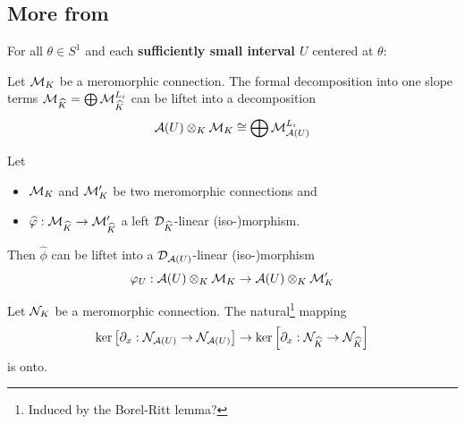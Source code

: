 \subsection{More from \cite{sabbah_cimpa90}}
For all $\theta\in S^1$ and each \textbf{sufficiently small interval $U$}
centered
at $\theta$:
\begin{cor}[2.3.2]
  Let $\mathcal{M}_K$ be a meromorphic connection.
  The formal decomposition into one slope terms
  $\mathcal{M}_{\widehat K}=\bigoplus \mathcal{M}_{\widehat K}^{L_i}$ can be liftet into a
  decomposition
  \[
    \mathcal{A}(U)\otimes_K\mathcal{M}_K \cong \bigoplus\mathcal{M}_{\mathcal{A}(U)}^{L_i}
  \]
\end{cor}
\begin{cor}[2.3.3]
  Let
  \begin{itemize}
    \item $\mathcal{M}_K$ and $\mathcal{M}_K'$ be two meromorphic connections and
    \item $\widehat{\varphi}:\mathcal{M}_{\widehat{K}}\to\mathcal{M}_{\widehat{K}}'$ a left
      $\mathcal{D}_{\widehat K}$-linear \textcolor{green!40!black}{(iso-)}morphism.
  \end{itemize}
  Then
  $\hat\phi$ can be liftet into a $\mathcal{D}_{\mathcal{A}(U)}$-linear
  \textcolor{green!40!black}{(iso-)}morphism
  \[
    \varphi_U:\mathcal{A}(U)\otimes_K\mathcal{M}_K\to\mathcal{A}(U)\otimes_K\mathcal{M}_K'
  \]

  \begin{lem}[2.3.4]
    Let $\mathcal{N}_K$ be a meromorphic connection.
    The natural\footnote{Induced by the Borel-Ritt lemma?} mapping
    \[
      \ker\left[\partial_x:\mathcal{N}_{\mathcal{A}(U)}\to\mathcal{N}_{\mathcal{A}(U)}\right]
      \to
      \ker\left[\partial_x:\mathcal{N}_{\widehat K}\to\mathcal{N}_{\widehat K}\right]
    \]
    is onto.
  \end{lem}
\end{cor}

